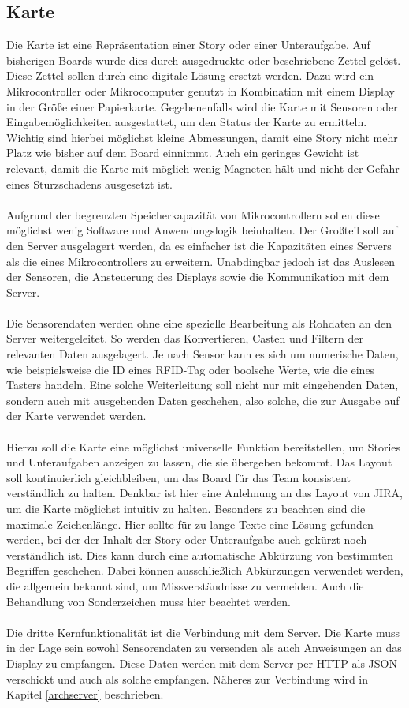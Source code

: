 \documentclass[12pt,titlepage]{scrartcl}
\begin{document}
		\subsection{Karte} \label{defKarte}
		Die Karte ist eine Repräsentation einer Story oder einer Unteraufgabe. Auf bisherigen Boards wurde dies durch ausgedruckte oder beschriebene Zettel gelöst. Diese Zettel sollen durch eine digitale Lösung ersetzt werden. Dazu wird ein Mikrocontroller oder Mikrocomputer genutzt in Kombination mit einem Display in der Größe einer Papierkarte. Gegebenenfalls wird die Karte mit Sensoren oder Eingabemöglichkeiten ausgestattet, um den Status der Karte zu ermitteln. Wichtig sind hierbei möglichst kleine Abmessungen, damit eine Story nicht mehr Platz wie bisher auf dem Board einnimmt. Auch ein geringes Gewicht ist relevant, damit die Karte mit möglich wenig Magneten hält und nicht der Gefahr eines Sturzschadens ausgesetzt ist. \\ \\
		Aufgrund der begrenzten Speicherkapazität von Mikrocontrollern sollen diese möglichst wenig Software und Anwendungslogik beinhalten. Der Großteil soll auf den Server ausgelagert werden, da es einfacher ist die Kapazitäten eines Servers als die eines Mikrocontrollers zu erweitern. Unabdingbar jedoch ist das Auslesen der Sensoren, die Ansteuerung des Displays sowie die Kommunikation mit dem Server. \\ \\
Die Sensorendaten werden ohne eine spezielle Bearbeitung als Rohdaten an den Server weitergeleitet. So werden das Konvertieren, Casten und Filtern der relevanten Daten ausgelagert. Je nach Sensor kann es sich um numerische Daten, wie beispielsweise die ID eines RFID-Tag oder boolsche Werte, wie die eines Tasters handeln. Eine solche Weiterleitung soll nicht nur mit eingehenden Daten, sondern auch mit ausgehenden Daten geschehen, also solche, die zur Ausgabe auf der Karte verwendet werden. \\ \\
Hierzu soll die Karte eine möglichst universelle Funktion bereitstellen, um Stories und Unteraufgaben anzeigen zu lassen, die sie übergeben bekommt. Das Layout soll kontinuierlich gleichbleiben, um das Board für das Team konsistent verständlich zu halten. Denkbar ist hier eine Anlehnung an das Layout von JIRA, um die Karte möglichst intuitiv zu halten. Besonders zu beachten sind die maximale Zeichenlänge. Hier sollte für zu lange Texte eine Lösung gefunden werden, bei der der Inhalt der Story oder Unteraufgabe auch gekürzt noch verständlich ist. Dies kann durch eine automatische Abkürzung von bestimmten Begriffen geschehen. Dabei können ausschließlich Abkürzungen verwendet werden, die allgemein bekannt sind, um Missverständnisse zu vermeiden. Auch die Behandlung von Sonderzeichen muss hier beachtet werden. \\ \\
Die dritte Kernfunktionalität ist die Verbindung mit dem Server. Die Karte muss in der Lage sein sowohl Sensorendaten zu versenden als auch Anweisungen an das Display zu empfangen. Diese Daten werden mit dem Server per HTTP als JSON verschickt und auch als solche empfangen. Näheres zur Verbindung wird in Kapitel \ref{archserver} beschrieben.  
\end{document}
